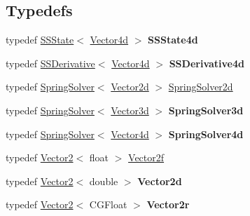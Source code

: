 \subsection*{Typedefs}
\begin{DoxyCompactItemize}
\item 
\mbox{\label{namespace_p_o_p_ae326f6ad92b8f3ee60c50ab962dffd14}} 
typedef \mbox{\hyperlink{struct_p_o_p_1_1_s_s_state}{S\+S\+State}}$<$ \mbox{\hyperlink{struct_p_o_p_1_1_vector4}{Vector4d}} $>$ {\bfseries S\+S\+State4d}
\item 
\mbox{\label{namespace_p_o_p_a085f6f78f9b782bc936c7d6dd2dff767}} 
typedef \mbox{\hyperlink{struct_p_o_p_1_1_s_s_derivative}{S\+S\+Derivative}}$<$ \mbox{\hyperlink{struct_p_o_p_1_1_vector4}{Vector4d}} $>$ {\bfseries S\+S\+Derivative4d}
\item 
typedef \mbox{\hyperlink{class_p_o_p_1_1_spring_solver}{Spring\+Solver}}$<$ \mbox{\hyperlink{struct_p_o_p_1_1_vector2}{Vector2d}} $>$ \mbox{\hyperlink{namespace_p_o_p_abc6146ca1cb1cbf135c3c68f4ad5682b}{Spring\+Solver2d}}
\item 
\mbox{\label{namespace_p_o_p_a35f82bb69908b911aba4be488b3a1c2e}} 
typedef \mbox{\hyperlink{class_p_o_p_1_1_spring_solver}{Spring\+Solver}}$<$ \mbox{\hyperlink{struct_p_o_p_1_1_vector3}{Vector3d}} $>$ {\bfseries Spring\+Solver3d}
\item 
\mbox{\label{namespace_p_o_p_a806cd03bd11070acefbc827becd9e603}} 
typedef \mbox{\hyperlink{class_p_o_p_1_1_spring_solver}{Spring\+Solver}}$<$ \mbox{\hyperlink{struct_p_o_p_1_1_vector4}{Vector4d}} $>$ {\bfseries Spring\+Solver4d}
\item 
typedef \mbox{\hyperlink{struct_p_o_p_1_1_vector2}{Vector2}}$<$ float $>$ \mbox{\hyperlink{namespace_p_o_p_a0f2c248f14bbcb8f47caca7091cca3b3}{Vector2f}}
\item 
\mbox{\label{namespace_p_o_p_abf27cd7a344146fe23f863709e300c92}} 
typedef \mbox{\hyperlink{struct_p_o_p_1_1_vector2}{Vector2}}$<$ double $>$ {\bfseries Vector2d}
\item 
\mbox{\label{namespace_p_o_p_ad5c9b64ee392fea48127502f9930d1c3}} 
typedef \mbox{\hyperlink{struct_p_o_p_1_1_vector2}{Vector2}}$<$ C\+G\+Float $>$ {\bfseries Vector2r}

\end{DoxyCompactItemize}
